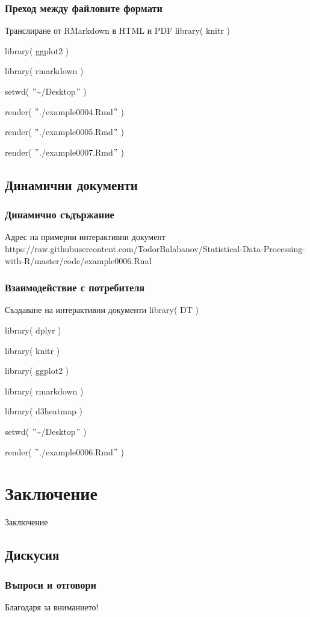 \documentclass{beamer}
\begin{document}
\begin{frame}
\frametitle{Преход между файловите формати}
\begin{block}{Транслиране от RMarkdown в HTML и PDF}
library( knitr )

library( ggplot2 )

library( rmarkdown )

setwd( $"$\textasciitilde /Desktop$"$ )

render( $"$./example0004.Rmd$"$ )

render( $"$./example0005.Rmd$"$ )

render( $"$./example0007.Rmd$"$ )
\end{block}
\end{frame}

\subsection{Динамични документи}

\begin{frame}
\frametitle{Динамично съдържание}
\begin{block}{Адрес на примерни интерактивни документ}
https://raw.githubusercontent.com/TodorBalabanov/Statistical-Data-Processing-with-R/master/code/example0006.Rmd
\end{block}
\end{frame}

\begin{frame}
\frametitle{Взаимодействие с потребителя}
\begin{block}{Създаване на интерактивни документи}
library( DT )

library( dplyr )

library( knitr )

library( ggplot2 )

library( rmarkdown )

library( d3heatmap )

setwd( $"$\textasciitilde /Desktop$"$ )

render( $"$./example0006.Rmd$"$ )
\end{block}
\end{frame}

\begin{frame}
\frametitle{}
\begin{block}{}
\end{block}
\end{frame}

\section{Заключение}

\begin{frame}
\center \huge{Заключение}
\end{frame}

\subsection{Дискусия}

\begin{frame}
\frametitle{Въпроси и отговори}
\center \huge{Благодаря за вниманието!}
\end{frame}
\end{document}
